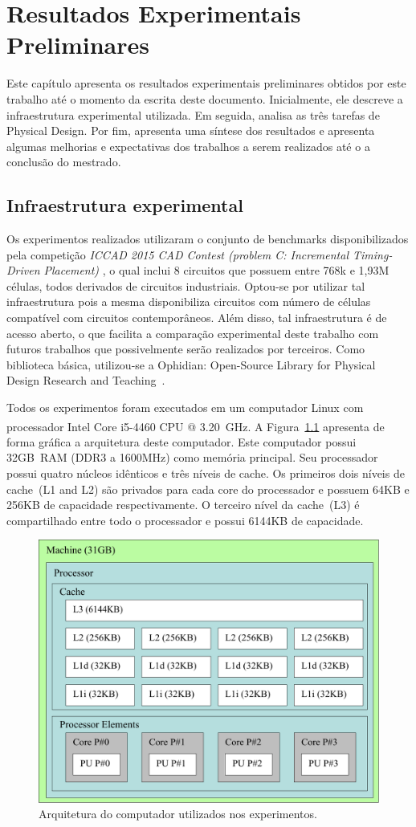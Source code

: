 \chapter{Resultados Experimentais Preliminares}
\label{cap:resultados}

Este capítulo apresenta os resultados experimentais preliminares obtidos por este trabalho até o momento da escrita deste documento. Inicialmente, ele descreve a infraestrutura experimental utilizada. Em seguida, analisa as três tarefas de Physical Design. Por fim, apresenta uma síntese dos resultados e apresenta algumas melhorias e expectativas dos trabalhos a serem realizados até o a conclusão do mestrado.

\section{Infraestrutura experimental}
\label{sec:infraestrutura_experimental}

Os experimentos realizados utilizaram o conjunto de benchmarks disponibilizados pela competição \textit{ICCAD 2015 CAD Contest (problem C: Incremental Timing-Driven Placement)} \cite{kim2015}, o qual inclui 8 circuitos que possuem entre 768k e 1,93M células, todos derivados de circuitos industriais. Optou-se por utilizar tal infraestrutura pois a mesma disponibiliza circuitos com número de células compatível com circuitos contemporâneos. Além disso, tal infraestrutura é de acesso aberto, o que facilita a comparação experimental deste trabalho com futuros trabalhos que possivelmente serão realizados por terceiros. Como biblioteca básica, utilizou-se a Ophidian: Open-Source Library for Physical Design Research and Teaching~\cite{ophidian}.

Todos os experimentos foram executados em um computador Linux com processador Intel\textsuperscript{\textregistered} Core\textsuperscript{\textregistered} i5-4460 CPU @ 3.20~GHz.
A Figura~\ref{fig:architectureMemoryZeus} apresenta de forma gráfica a arquitetura deste computador.
Este computador possui 32GB~RAM (DDR3 a 1600MHz) como memória principal.
Seu processador possui quatro núcleos idênticos e três níveis de cache.
Os primeiros dois níveis de cache~(L1 and L2) são privados para cada core do processador e possuem 64KB e 256KB de capacidade respectivamente.
O terceiro nível da cache~(L3) é compartilhado entre todo o processador e possui 6144KB de capacidade.

\begin{figure}[ht]
    \centering
    \includegraphics[width=0.5\linewidth]{img/results/architectureMemoryZeus.pdf}
    \caption{Arquitetura do computador utilizados nos experimentos.}
    \label{fig:architectureMemoryZeus}
\end{figure}

